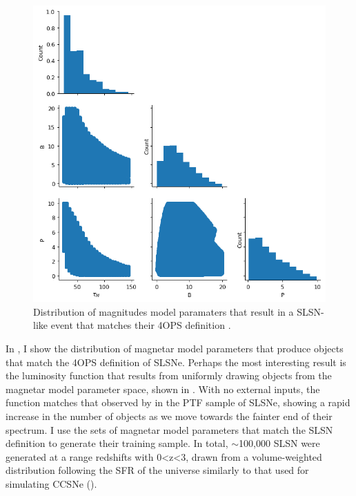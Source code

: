 \begin{figure}
  \includegraphics[width=\textwidth]{Figures/Chapter5/MagParams.png}
  \caption{Distribution of magnitudes model paramaters that result in a SLSN-like event that matches their 4OPS definition \citep{Inserra2018a}.}
  \label{fig:4OPSMag}
\end{figure}

In , I show the distribution of magnetar model parameters that produce objects that match the 4OPS definition of SLSNe. Perhaps the most interesting result is the luminosity function that results from uniformly drawing objects from the magnetar model parameter space, shown in . With no external inputs, the function matches that observed by \citet{DeCia2017} in the PTF sample of SLSNe, showing a rapid increase in the number of objects as we move towards the fainter end of their spectrum. I use the sets of magnetar model parameters that match the SLSN definition to generate their training sample. In total, $\sim$100,000 SLSN were generated at a range redshifts with 0<z<3, drawn from a volume-weighted distribution following the SFR of the universe \citep{Beacon2004} similarly to that used for simulating CCSNe ().

